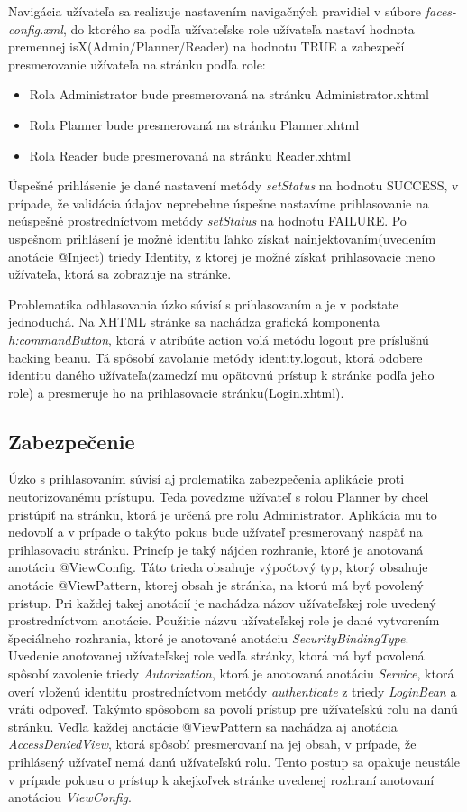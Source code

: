 Navigácia užívateľa sa realizuje nastavením navigačných pravidiel v súbore \emph{faces-config.xml}, do ktorého sa podľa užívateľske role užívateľa nastaví hodnota premennej isX(Admin/Planner/Reader) na hodnotu TRUE a zabezpečí presmerovanie užívateľa na stránku podľa role:
\begin{itemize}
\item Rola Administrator bude presmerovaná na stránku Administrator.xhtml 
\item Rola Planner bude presmerovaná na stránku Planner.xhtml
\item Rola Reader bude presmerovaná na stránku Reader.xhtml
\end{itemize}

Úspešné prihlásenie je dané nastavení metódy \emph{setStatus} na hodnotu SUCCESS, v prípade, že validácia údajov neprebehne úspešne nastavíme prihlasovanie na neúspešné prostredníctvom metódy \emph{setStatus} na hodnotu FAILURE. Po uspešnom prihlásení je možné identitu ľahko získať nainjektovaním(uvedením anotácie @Inject) triedy Identity, z ktorej je možné získať prihlasovacie meno užívateľa, ktorá sa zobrazuje na stránke.

Problematika odhlasovania úzko súvisí s prihlasovaním a je v podstate jednoduchá. Na XHTML stránke sa nachádza grafická komponenta \emph{h:commandButton}, ktorá v atribúte action volá metódu logout pre príslušnú backing beanu. Tá spôsobí zavolanie metódy identity.logout, ktorá odobere identitu daného užívateľa(zamedzí mu opätovnú prístup k stránke podľa jeho role) a presmeruje ho na prihlasovacie stránku(Login.xhtml).

\subsection{Zabezpečenie}
Úzko s prihlasovaním súvisí aj prolematika zabezpečenia aplikácie proti neutorizovanému prístupu. Teda povedzme užívateľ s rolou Planner by chcel pristúpiť na stránku, ktorá je určená pre rolu Administrator. Aplikácia mu to nedovolí a v prípade o takýto pokus bude užívateľ presmerovaný naspäť na prihlasovaciu stránku. Princíp je taký nájden rozhranie, ktoré je anotovaná anotáciu @ViewConfig. Táto trieda obsahuje výpočtový typ, ktorý obsahuje anotácie @ViewPattern, ktorej obsah je stránka, na ktorú má byť povolený prístup. Pri každej takej anotácií je nachádza názov užívateľskej role uvedený prostredníctvom anotácie. Použitie názvu užívateľskej role je dané vytvorením špeciálneho rozhrania, ktoré je anotované anotáciu \emph{SecurityBindingType}. Uvedenie anotovanej užívateľskej role vedľa stránky, ktorá má byť povolená spôsobí zavolenie triedy \emph{Autorization}, ktorá je anotovaná anotáciu \emph{Service}, ktorá overí vloženú identitu prostredníctvom metódy \emph{authenticate} z triedy \emph{LoginBean} a vráti odpoveď. Takýmto spôsobom sa povolí prístup pre užívateľskú rolu na danú stránku. Veďla každej anotácie @ViewPattern sa nachádza aj anotácia \emph{AccessDeniedView}, ktorá spôsobí presmerovaní na jej obsah, v prípade, že prihlásený užívateľ nemá danú užívateľskú rolu. Tento postup sa opakuje neustále v prípade pokusu o prístup k akejkoľvek stránke uvedenej rozhraní anotovaní anotáciou \emph{ViewConfig}.



